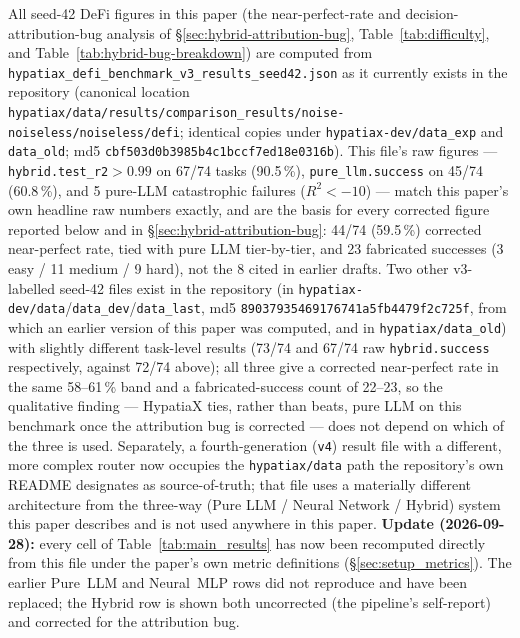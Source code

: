 \documentclass[twoside,11pt]{article}
\newcommand{\Rsq}{R^{2}}
\begin{document}
\begin{center}
{{All seed-42 DeFi figures in this paper (the near-perfect-rate and
decision-attribution-bug analysis of \S\ref{sec:hybrid-attribution-bug},
Table~\ref{tab:difficulty}, and Table~\ref{tab:hybrid-bug-breakdown}) are
computed from \texttt{hypatiax\_defi\_benchmark\_v3\_results\_seed42.json}
as it currently exists in the repository (canonical location
\texttt{hypatiax/data/results/comparison\_results/noise-noiseless/noiseless/defi};
identical copies under \texttt{hypatiax-dev/data\_exp} and \texttt{data\_old};
md5 \texttt{cbf503d0b3985b4c1bccf7ed18e0316b}). This file's raw figures
--- \texttt{hybrid.test\_r2}$>0.99$ on 67/74 tasks (90.5\,\%),
\texttt{pure\_llm.success} on 45/74 (60.8\,\%), and 5 pure-LLM
catastrophic failures ($\Rsq<-10$) --- match this paper's own headline
raw numbers exactly, and are the basis for every corrected figure
reported below and in \S\ref{sec:hybrid-attribution-bug}: 44/74 (59.5\,\%)
corrected near-perfect rate, tied with pure LLM tier-by-tier, and 23
fabricated successes (3 easy / 11 medium / 9 hard), not the 8 cited in
earlier drafts. Two other v3-labelled seed-42 files exist in the
repository (in \texttt{hypatiax-dev/data}/\texttt{data\_dev}/\texttt{data\_last},
md5 \texttt{89037935469176741a5fb4479f2c725f}, from which an earlier version of this paper was computed, and in
\texttt{hypatiax/data\_old}) with slightly different task-level results
(73/74 and 67/74 raw \texttt{hybrid.success} respectively, against 72/74
above); all three give a corrected near-perfect rate in the same
58--61\,\% band and a fabricated-success count of 22--23, so the
qualitative finding --- HypatiaX ties, rather than beats, pure LLM on
this benchmark once the attribution bug is corrected --- does not depend
on which of the three is used. Separately, a fourth-generation
(\texttt{v4}) result file with a different, more complex router now
occupies the \texttt{hypatiax/data} path the repository's own README
designates as source-of-truth; that file uses a materially different
architecture from the three-way (Pure LLM / Neural Network / Hybrid)
system this paper describes and is not used anywhere in this paper. \textbf{Update (2026-09-28):} every cell of
Table~\ref{tab:main_results} has now been recomputed directly from this
file under the paper's own metric definitions (\S\ref{sec:setup_metrics}).
The earlier Pure~LLM and Neural~MLP rows did not reproduce and have been
replaced; the Hybrid row is shown both uncorrected (the pipeline's
self-report) and corrected for the attribution bug.}}
\end{center}
\vspace{0.5em}
\end{document}
